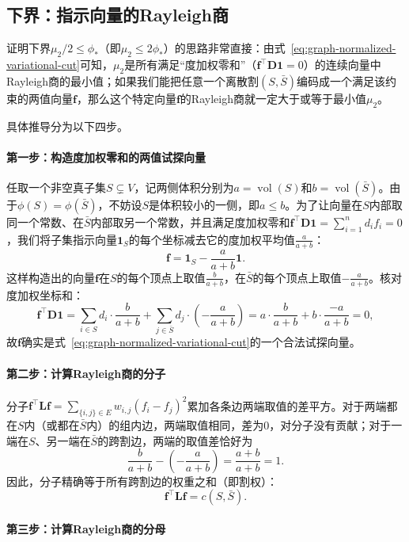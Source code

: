 \subsection{下界：指示向量的Rayleigh商}
\label{sec:graph-cheeger-lower}

证明下界$\mu_2/2\leq\phi_*$（即$\mu_2\leq 2\phi_*$）的思路非常直接：由式~\eqref{eq:graph-normalized-variational-cut}可知，$\mu_2$是所有满足“度加权零和”（$\bm f^\top\bm D\bm 1=0$）的连续向量中Rayleigh商的最小值；如果我们能把任意一个离散割$(S,\bar S)$编码成一个满足该约束的两值向量$\bm f$，那么这个特定向量$\bm f$的Rayleigh商就一定大于或等于最小值$\mu_2$。

具体推导分为以下四步。

\paragraph{第一步：构造度加权零和的两值试探向量}

任取一个非空真子集$S\subsetneq V$，记两侧体积分别为$a=\operatorname{vol}(S)$和$b=\operatorname{vol}(\bar S)$。由于$\phi(S)=\phi(\bar S)$，不妨设$S$是体积较小的一侧，即$a\leq b$。为了让向量在$S$内部取同一个常数、在$\bar S$内部取另一个常数，并且满足度加权零和$\bm f^\top\bm D\bm 1=\sum_{i=1}^n d_i f_i=0$，我们将子集指示向量$\bm 1_S$的每个坐标减去它的度加权平均值$\frac{a}{a+b}$：
\[
\bm f=\bm1_S-\frac{a}{a+b}\bm1.
\]
这样构造出的向量$\bm f$在$S$的每个顶点上取值$\frac{b}{a+b}$，在$\bar S$的每个顶点上取值$-\frac{a}{a+b}$。核对度加权坐标和：
\[
\bm f^\top\bm D\bm 1
= \sum_{i\in S}d_i\cdot\frac{b}{a+b} + \sum_{j\in\bar S}d_j\cdot\left(-\frac{a}{a+b}\right)
= a\cdot\frac{b}{a+b}+b\cdot\frac{-a}{a+b}=0,
\]
故$\bm f$确实是式~\eqref{eq:graph-normalized-variational-cut}的一个合法试探向量。

\paragraph{第二步：计算Rayleigh商的分子}

分子$\bm f^\top\bm L\bm f=\sum_{\{i,j\}\in E}w_{i,j}(f_i-f_j)^2$累加各条边两端取值的差平方。对于两端都在$S$内（或都在$\bar S$内）的组内边，两端取值相同，差为$0$，对分子没有贡献；对于一端在$S$、另一端在$\bar S$的跨割边，两端的取值差恰好为
\[
  \frac{b}{a+b} - \left(-\frac{a}{a+b}\right) = \frac{a+b}{a+b} = 1.
\]
因此，分子精确等于所有跨割边的权重之和（即割权）：
\[
\bm f^\top\bm L\bm f=c(S,\bar S).
\]

\paragraph{第三步：计算Rayleigh商的分母}

